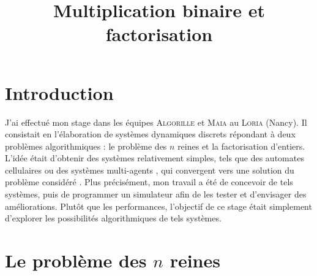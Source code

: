 \documentclass[11pt, openany, a4paper]{article}
\newcommand{\ANNOT}[1]{
  ~\linebreak
  \centerline{
    \large\fcolorbox{black}{bleuclair}{
      \begin{minipage}[h]{.8\linewidth}
      #1
      \end{minipage}
    }
  }
}
\begin{document}
\renewcommand{\labelitemi}{$\bullet$}

\title{\vspace{-3em}Multiplication binaire et factorisation}
\date{}



\maketitle

% 

\part*{Introduction}

J'ai effectué mon stage dans les équipes \textsc{Algorille} et \textsc{Maia} au \textsc{Loria} (Nancy). Il consistait en l'élaboration de systèmes dynamiques discrets répondant à deux problèmes algorithmiques : le problème des $n$ reines et la factorisation d'entiers. L'idée était d'obtenir des systèmes relativement simples, tels que des automates cellulaires ou des systèmes multi-agents \cite{ChevFat08}, qui convergent vers une solution du problème considéré \cite{BahiC06}. Plus précisément, mon travail a été de concevoir de tels systèmes, puis de programmer un simulateur afin de les tester et d'envisager des améliorations. Plutôt que les performances, l'objectif de ce stage était simplement d'explorer les possibilités algorithmiques de tels systèmes. 


\part*{Le problème des $n$ reines}
\label{part:nreines}


\end{document}
